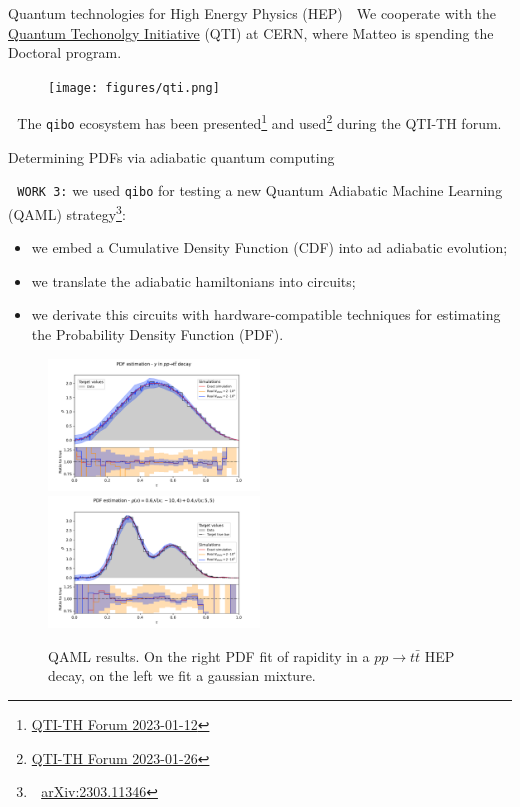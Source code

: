 \documentclass[8pt, xcolor={svgnames}, hyperref={colorlinks,linkcolor=black, citecolor=black, urlcolor=black}]{beamer}
\begin{document}
\begin{frame}{Quantum technologies for High Energy Physics (HEP)}
\faTerminal\,\, We cooperate with the 
\href{https://quantum.cern/}{Quantum Techonolgy Initiative} (QTI) at CERN, where 
Matteo is spending the Doctoral program.
\begin{figure}
    \texttt{[image: figures/qti.png]}%
    \label{fig:full_stack}
\end{figure}
\faTerminal\,\, The \texttt{qibo} ecosystem has been presented\footnote{\href{https://indico.cern.ch/event/1235582/}{QTI-TH Forum 2023-01-12}}
and used\footnote{\href{https://indico.cern.ch/event/1235584/}{QTI-TH Forum 2023-01-26}}
during the QTI-TH forum.
\end{frame}


\begin{frame}{Determining PDFs via adiabatic quantum computing}

\faTerminal\,\, \texttt{WORK 3:} we used \texttt{qibo} for testing a new Quantum
Adiabatic Machine Learning (QAML) strategy\footnote{\faBook\,\, \href{https://arxiv.org/abs/2303.11346}{arXiv:2303.11346}}:
\begin{itemize}[noitemsep]
    \item[\tiny\faSquare] we embed a Cumulative Density Function (CDF) into ad adiabatic
    evolution;
    \item[\tiny\faSquare] we translate the adiabatic hamiltonians into circuits;
    \item[\tiny\faSquare] we derivate this circuits with hardware-compatible techniques
    for estimating the Probability Density Function (PDF).
\end{itemize}

\begin{figure}
    \includegraphics[width=0.5\textwidth]{figures/rapidity.pdf}%
    \includegraphics[width=0.5\textwidth]{figures/gauss.pdf}
    \caption{QAML results. On the right PDF fit of rapidity in a $pp\to t\bar{t}$ HEP decay,
    on the left we fit a gaussian mixture.}
    \label{fig:adiabatic_fit}
\end{figure}
\end{frame}
\end{document}
